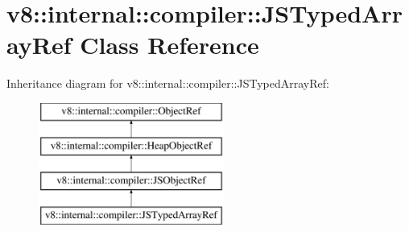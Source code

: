 \hypertarget{classv8_1_1internal_1_1compiler_1_1JSTypedArrayRef}{}\section{v8\+:\+:internal\+:\+:compiler\+:\+:J\+S\+Typed\+Array\+Ref Class Reference}
\label{classv8_1_1internal_1_1compiler_1_1JSTypedArrayRef}
Inheritance diagram for v8\+:\+:internal\+:\+:compiler\+:\+:J\+S\+Typed\+Array\+Ref\+:\begin{figure}[H]
\begin{center}
\leavevmode
\includegraphics[height=4.000000cm]{classv8_1_1internal_1_1compiler_1_1JSTypedArrayRef}
\end{center}
\end{figure}
